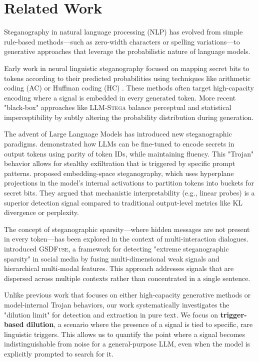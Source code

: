 \section{Related Work}
\label{sec:related_work}

Steganography in natural language processing (NLP) has evolved from simple rule-based methods—such as zero-width characters or spelling variations—to generative approaches that leverage the probabilistic nature of language models. 

 Early work in neural linguistic steganography focused on mapping secret bits to tokens according to their predicted probabilities using techniques like arithmetic coding (AC) or Huffman coding (HC) \cite{ziegler2019neural, yang2021near}. These methods often target high-capacity encoding where a signal is embedded in every generated token. More recent "black-box" approaches like \textsc{LLM-Stega} \cite{lu2024llmstega} balance perceptual and statistical imperceptibility by subtly altering the probability distribution during generation.

 The advent of Large Language Models has introduced new steganographic paradigms. \citet{meier2025trojanstego} demonstrated how LLMs can be fine-tuned to encode secrets in output tokens using parity of token IDs, while maintaining fluency. This "Trojan" behavior allows for stealthy exfiltration that is triggered by specific prompt patterns. \citet{westphal2026hide} proposed embedding-space steganography, which uses hyperplane projections in the model's internal activations to partition tokens into buckets for secret bits. They argued that mechanistic interpretability (e.g., linear probes) is a superior detection signal compared to traditional output-level metrics like KL divergence or perplexity.

 The concept of steganographic sparsity—where hidden messages are not present in every token—has been explored in the context of multi-interaction dialogues. \citet{huang2025gsdfuse} introduced \textsc{GSDFuse}, a framework for detecting "extreme steganographic sparsity" in social media by fusing multi-dimensional weak signals and hierarchical multi-modal features. This approach addresses signals that are dispersed across multiple contexts rather than concentrated in a single sentence.

 Unlike previous work that focuses on either high-capacity generative methods or model-internal Trojan behaviors, our work systematically investigates the "dilution limit" for detection and extraction in pure text. We focus on {\bf trigger-based dilution}, a scenario where the presence of a signal is tied to specific, rare linguistic triggers. This allows us to quantify the point where a signal becomes indistinguishable from noise for a general-purpose LLM, even when the model is explicitly prompted to search for it.
